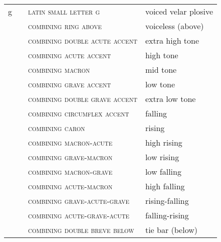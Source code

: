\label{tab:ipa_lax}
 \tablelasttail{\bottomrule}

\begin{center}
\begin{xtabular}{ l L{1.2cm} L{6.1cm} L{3.5cm} }
g &  & \textsc{latin small letter g} & voiced velar plosive \\
 &  & \textsc{combining ring above} & voiceless (above) \\
 &  & \textsc{combining double acute accent} & extra high tone \\
 &  & \textsc{combining acute accent} & high tone \\
 &  & \textsc{combining macron} & mid tone \\
 &  & \textsc{combining grave accent} & low tone \\
 &  & \textsc{combining double grave accent} & extra low tone \\
 &  & \textsc{combining circumflex accent} & falling \\
 &  & \textsc{combining caron} & rising \\
 &  & \textsc{combining macron-acute} & high rising \\
 &  & \textsc{combining grave-macron} & low rising \\
 &  & \textsc{combining macron-grave} & low falling \\
 &  & \textsc{combining acute-macron} & high falling \\
 &  & \textsc{combining grave-acute-grave} & rising-falling \\
 &  & \textsc{combining acute-grave-acute} & falling-rising \\ 
 &  & \textsc{combining double breve below} & tie bar (below) \\
\end{xtabular}
\end{center}
